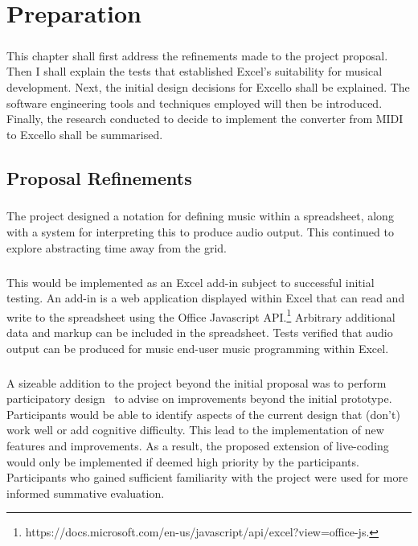 
\chapter{Preparation}

\paragraph{} This chapter shall first address the refinements made to the project proposal. Then I shall explain the tests that established Excel's suitability for musical development. Next, the initial design decisions for Excello shall be explained. The software engineering tools and techniques employed will then be introduced. Finally, the research conducted to decide to implement the converter from MIDI to Excello shall be summarised.

\section{Proposal Refinements}

\paragraph{} The project designed a notation for defining music within a spreadsheet, along with a system for interpreting this to produce audio output. This continued to explore abstracting time away from the grid.

\paragraph{} This would be implemented as an Excel add-in subject to successful initial testing. An add-in is a web application displayed within Excel that can read and write to the spreadsheet using the Office Javascript API.\footnote{https://docs.microsoft.com/en-us/javascript/api/excel?view=office-js.} Arbitrary additional data and markup can be included in the spreadsheet. Tests verified that audio output can be produced for music end-user music programming within Excel.

\paragraph{} A sizeable addition to the project beyond the initial proposal was to perform participatory design~\cite{muller:pd} to advise on improvements beyond the initial prototype. Participants would be able to identify aspects of the current design that (don't) work well or add cognitive difficulty. This lead to the implementation of new features and improvements. As a result, the proposed extension of live-coding would only be implemented if deemed high priority by the participants. Participants who gained sufficient familiarity with the project were used for more informed summative evaluation.


